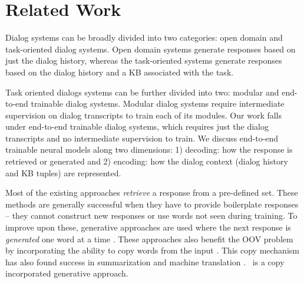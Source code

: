 \section{Related Work}

Dialog systems can be broadly divided into two categories: open domain \cite{vinyals2015neural,serban2016building} and task-oriented dialog systems. Open domain systems generate responses based on just the dialog history, whereas the task-oriented systems generate responses based on the dialog history and a KB associated with the task. 

Task oriented dialogs systems can be further divided into two: modular and end-to-end trainable dialog systems. Modular dialog systems \cite{wen2017network,williams2017hybrid,williams2007partially} require intermediate supervision on dialog transcripts to train each of its modules. Our work falls under end-to-end trainable dialog systems, which requires just the dialog transcripts and no intermediate supervision to train. We discuss end-to-end trainable neural models along two dimensions: 1) decoding: how the response is retrieved or generated and 2) encoding: how the dialog context (dialog history and KB tuples) are represented. 

Most of the existing approaches \cite{BordesW16,liu2017gated,seo2016query,wu2017end} {\em retrieve} a response from a pre-defined set. These methods are generally successful when they have to provide boilerplate responses -- they cannot construct new responses or use words not seen during training. 
To improve upon these, generative approaches are used where the next response is {\em generated} one word at a time \cite{eric2017copy,mem2seq}. These approaches also benefit the OOV problem by incorporating the ability to copy words from the input \cite{vinyals2015pointer,gu2016incorporating}. This copy mechanism has also found success in summarization \cite{nallapati2016abstractive,see2017get} and machine translation \cite{ptr-unk}. \sys\ is a copy incorporated generative approach.


